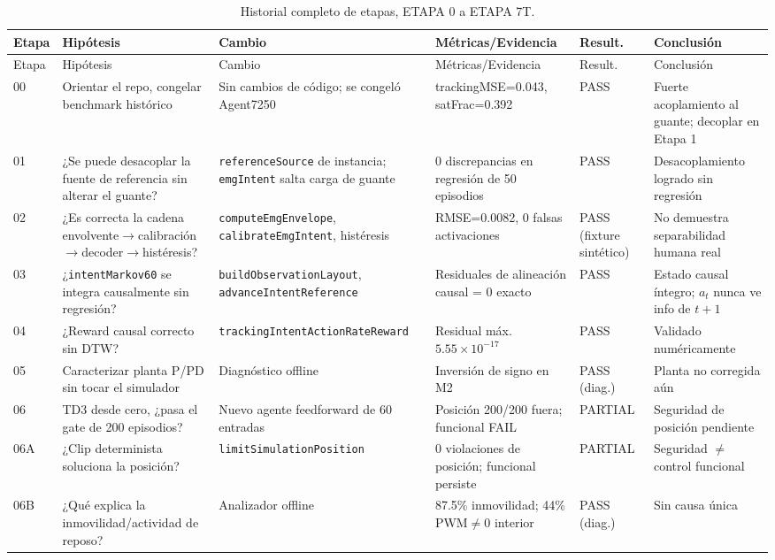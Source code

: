 \documentclass[11pt,a4paper]{article}
\begin{document}
\begin{longtable}{p{1.3cm}p{3.1cm}p{3.3cm}p{3.6cm}p{1.6cm}p{3.4cm}}
\caption{Historial completo de etapas, ETAPA 0 a ETAPA 7T.}
\label{tab:etapas}\\
\toprule
Etapa & Hipótesis & Cambio & Métricas/Evidencia & Result. & Conclusión \\
\midrule
\endfirsthead
\toprule
Etapa & Hipótesis & Cambio & Métricas/Evidencia & Result. & Conclusión \\
\midrule
\endhead
00 & Orientar el repo, congelar benchmark histórico & Sin cambios de código; se congeló Agent7250 & trackingMSE=0.043, satFrac=0.392 & PASS & Fuerte acoplamiento al guante; decoplar en Etapa 1 \\
01 & ¿Se puede desacoplar la fuente de referencia sin alterar el guante? & \texttt{referenceSource} de instancia; \texttt{emgIntent} salta carga de guante & 0 discrepancias en regresión de 50 episodios & PASS & Desacoplamiento logrado sin regresión \\
02 & ¿Es correcta la cadena envolvente$\to$calibración$\to$decoder$\to$histéresis? & \texttt{computeEmgEnvelope}, \texttt{calibrateEmgIntent}, histéresis & RMSE=0.0082, 0 falsas activaciones & PASS (fixture sintético) & No demuestra separabilidad humana real \\
03 & ¿\texttt{intentMarkov60} se integra causalmente sin regresión? & \texttt{buildObservationLayout}, \texttt{advanceIntentReference} & Residuales de alineación causal = 0 exacto & PASS & Estado causal íntegro; $a_t$ nunca ve info de $t+1$ \\
04 & ¿Reward causal correcto sin DTW? & \texttt{trackingIntentActionRateReward} & Residual máx. $5.55\times10^{-17}$ & PASS & Validado numéricamente \\
05 & Caracterizar planta P/PD sin tocar el simulador & Diagnóstico offline & Inversión de signo en M2 & PASS (diag.) & Planta no corregida aún \\
06 & TD3 desde cero, ¿pasa el gate de 200 episodios? & Nuevo agente feedforward de 60 entradas & Posición 200/200 fuera; funcional FAIL & PARTIAL & Seguridad de posición pendiente \\
06A & ¿Clip determinista soluciona la posición? & \texttt{limitSimulationPosition} & 0 violaciones de posición; funcional persiste & PARTIAL & Seguridad $\neq$ control funcional \\
06B & ¿Qué explica la inmovilidad/actividad de reposo? & Analizador offline & 87.5\% inmovilidad; 44\% PWM$\neq$0 interior & PASS (diag.) & Sin causa única \\

\end{longtable}
\end{document}
